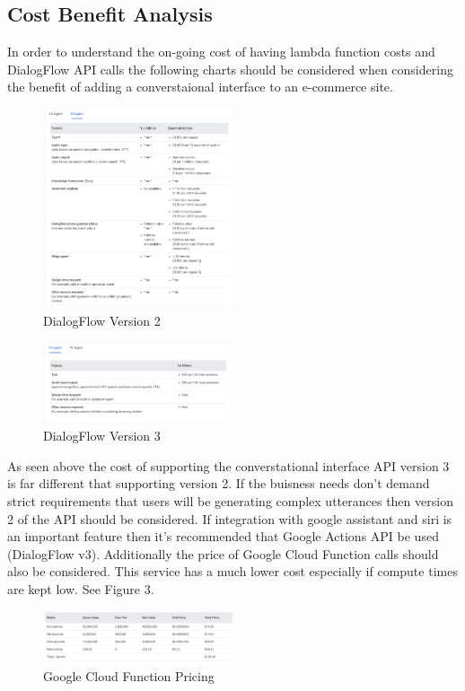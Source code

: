 \documentclass[9pt,software]{livecoms}
\begin{document}
\subsection{Cost Benefit Analysis}
In order to understand the on-going cost of having lambda function costs and DialogFlow API calls the following charts should be considered when 
considering the benefit of adding a converstaional interface to an e-commerce site. 

\begin{figure}
  \caption{DialogFlow Version 2}
  \centering
    \includegraphics[width=0.5\textwidth]{ESAgent.PNG}
\end{figure}

\begin{figure}
  \caption{DialogFlow Version 3}
  \centering
    \includegraphics[width=0.5\textwidth]{CX_Agent.PNG}
\end{figure}

As seen above the cost of supporting the converstational interface API version 3 is far different that supporting version 2. If the buisness needs don't demand strict requirements 
that users will be generating complex utterances then version 2 of the API should be considered. If integration with google assistant and siri is an important feature then it's recommended
that Google Actions API be used (DialogFlow v3). Additionally the price of Google Cloud Function calls should also be considered. This service has a much lower cost especially if compute times
are kept low. See Figure 3.

\begin{figure}
  \caption{Google Cloud Function Pricing}
  \centering
    \includegraphics[width=0.5\textwidth]{GCloudFunction.PNG}
\end{figure}
\end{document}
